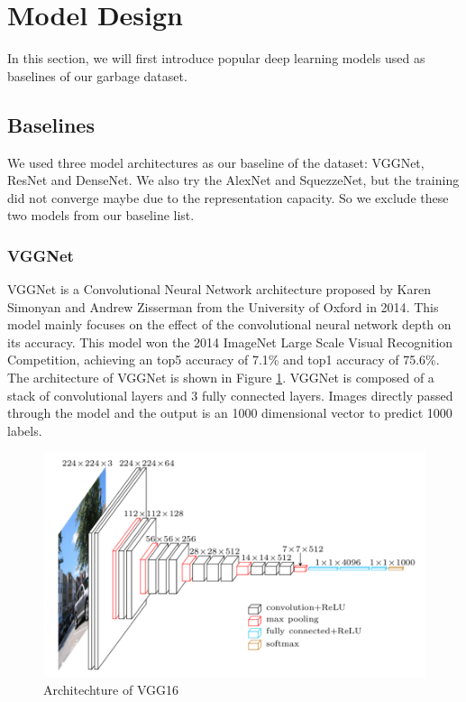 \section{Model Design}

In this section, we will first introduce popular deep learning models used as baselines of our garbage dataset.

\subsection{Baselines}

We used three model architectures as our baseline of the dataset: VGGNet\cite{vgg2014}, ResNet\cite{resnet2016} and DenseNet\cite{densenet2017}. We also try the AlexNet\cite{alexnet} and SquezzeNet\cite{squeezenet2016}, but the training did not converge maybe due to the representation capacity. So we exclude these two models from our baseline list.

\subsubsection{VGGNet}

VGGNet is a Convolutional Neural Network architecture proposed by Karen Simonyan and Andrew Zisserman from the University of Oxford in 2014\cite{vgg2014}. This model mainly focuses on the effect of the convolutional neural network depth on its accuracy. This model won the 2014 ImageNet Large Scale Visual Recognition Competition, achieving an top5 accuracy of 7.1\% and top1 accuracy of 75.6\%. The architecture of VGGNet is shown in Figure \ref{fig:vgg}. VGGNet is composed of a stack of convolutional layers and 3 fully connected layers. Images directly passed through the model and the output is an 1000 dimensional vector to predict 1000 labels.
\begin{figure}[ht]
	\centering
	\includegraphics[scale=1.]{figs/vgg16.png}
	\caption{Architechture of VGG16\cite{vgg_arch}}
	\label{fig:vgg}
\end{figure}

